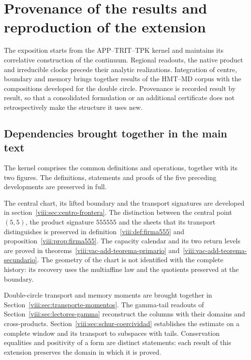 \section{Provenance of the results and reproduction of the extension}
\label{viii:ap:procedencia-reproduccion}
\begingroup
\setlength{\parskip}{1pt}

The exposition starts from the APP--TRIT--TPK kernel and maintains its
correlative construction of the continuum. Regional readouts, the native product and
irreducible clocks precede their analytic realizations. Integration
of centre, boundary and memory brings together results of the HMT--MD corpus with
the compositions developed for the double circle. Provenance is
recorded result by result, so that a consolidated formulation or an additional
certificate does not retrospectively make the structure it uses new.

\subsection{Dependencies brought together in the main text}

The kernel comprises the common definitions and operations, together
with its two figures. The definitions, statements and proofs of the
five preceding developments are preserved in full.

The central chart, its lifted boundary and the transport signatures are
developed in section~\ref{viii:sec:centro-frontera}. The distinction between
the central point \((5,5)\), the product signature \(555555\) and the sheets that
its transport distinguishes is preserved in definition~\ref{viii:def:firma555}
and proposition~\ref{viii:prop:firma555}. The capacity calendar and its
two return levels are proved in
theorems~\ref{viii:vac-add-teorema-primario} and~\ref{viii:vac-add-teorema-secundario}.
The geometry of the chart is not identified with the complete history: its
recovery uses the multiaffine law and the quotients preserved at the boundary.

Double-circle transport and memory moments are brought together in
Section~\ref{viii:sec:transporte-momentos}. The gamma-tail readouts of
Section~\ref{viii:sec:lectores-gamma} reconstruct the columns with their
domains and cross-products. Section~\ref{viii:sec:schur-coercividad}
establishes the estimate on a complete window and its transport to
subspaces with tails. Conservation equalities and positivity
of a form are distinct statements: each result of this extension
preserves the domain in which it is proved.

